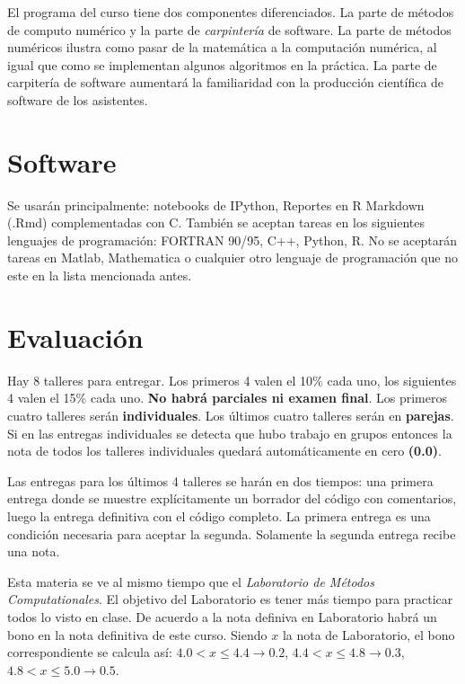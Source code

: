 \documentclass[11pt]{article}
\begin{document}
El programa del curso tiene dos componentes diferenciados. La parte de
m\'etodos de computo num\'erico y la parte de
\emph{carpinter\'ia} de software. La parte de m\'etodos num\'ericos
ilustra como pasar de la matem\'atica a la computaci\'on num\'erica,
al igual que como se implementan algunos algoritmos en la pr\'actica. 
La parte de carpiter\'ia de software aumentar\'a la familiaridad con
la producci\'on cient\'ifica de software de los asistentes.


\section*{Software}
\noindent Se usar\'an principalmente: notebooks de IPython, Reportes en R Markdown (.Rmd) complementadas con C. Tambi\'en se aceptan tareas en los siguientes lenguajes de programaci\'on: FORTRAN 90/95, C++, Python, R. No se aceptar\'an tareas en Matlab, Mathematica o cualquier otro lenguaje
de programaci\'on que no este en la lista mencionada antes.  

\section*{Evaluaci\'on}

Hay 8 talleres para entregar. Los primeros 4 valen el 10\% cada uno,
los siguientes 4 valen el 15\% cada uno. \textbf{No habr\'a parciales ni
examen final}. Los primeros cuatro talleres ser\'an \textbf{individuales}. Los
\'ultimos cuatro talleres ser\'an en \textbf{parejas}.  Si en las entregas
individuales se detecta que hubo trabajo en grupos entonces la nota de
todos los talleres individuales quedar\'a autom\'aticamente en cero
\textbf{(0.0)}.  

Las entregas para los \'ultimos 4 talleres se har\'an en dos tiempos:
una primera entrega donde se muestre expl\'icitamente un borrador del
c\'odigo con comentarios, luego la entrega definitiva con el c\'odigo
completo. La primera entrega es una condici\'on necesaria para aceptar
la segunda. Solamente la segunda entrega recibe una nota. 

Esta materia se ve al mismo tiempo que el \emph{Laboratorio de M\'etodos
Computationales}. El objetivo del Laboratorio es tener m\'as tiempo
para practicar todos lo visto en clase. De acuerdo a la
nota definiva en Laboratorio habr\'a un bono en la nota definitiva de
este curso. Siendo $x$ la nota de Laboratorio, el bono correspondiente
se calcula as\'i:
$4.0 < x \leq 4.4 \rightarrow 0.2$, $4.4< x\leq 4.8\rightarrow 0.3$, $4.8<x
\leq 5.0\rightarrow 0.5$.
\end{document}

